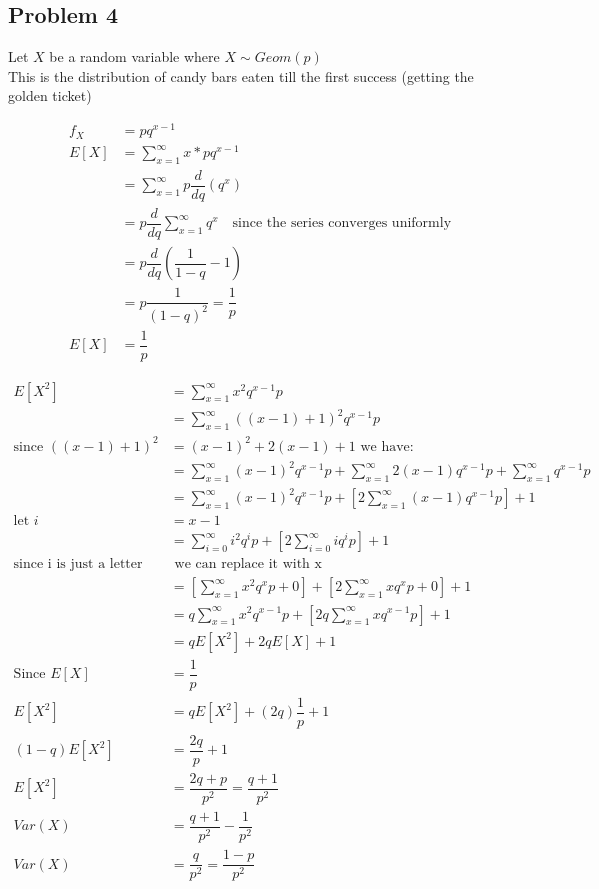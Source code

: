 \documentclass{article}
\begin{document}
\begin{flushleft}
\section*{Problem 4}
Let $X$ be a random variable where $X \sim Geom(p)$\\
This is the distribution of candy bars eaten till the first success (getting the golden ticket)

\begin{align*}
f_X&=pq^{x-1}\\
E[X]&=\sum_{x=1}^{\infty}x*pq^{x-1}\\
&=\sum_{x=1}^{\infty}p\dfrac{d}{dq}(q^x)\\
&=p\dfrac{d}{dq}\sum_{x=1}^{\infty}q^x \quad \text{since the series converges uniformly}\\
&=p\dfrac{d}{dq}(\dfrac{1}{1-q}-1)\\
&=p\dfrac{1}{(1-q)^2}=\dfrac{1}{p}\\
E[X]&=\dfrac{1}{p}
\end{align*}

\begin{align*}
E[X^2]&=\sum_{x=1}^{\infty}x^2q^{x-1}p\\
&=\sum_{x=1}^{\infty}((x-1)+1)^2q^{x-1}p\\
\text{since } ((x-1)+1)^2&=(x-1)^2+2(x-1)+1 \text{ we have:}\\
&=\sum_{x=1}^{\infty}(x-1)^2 q^{x-1}p+\sum_{x=1}^{\infty}2(x-1) q^{x-1}p+\sum_{x=1}^{\infty}q^{x-1}p\\
&=\sum_{x=1}^{\infty}(x-1)^2q^{x-1}p+[2\sum_{x=1}^{\infty}(x-1)q^{x-1}p]+1\\
\text{let } i&=x-1\\
&=\sum_{i=0}^{\infty}i^2q^{i}p+[2\sum_{i=0}^{\infty}iq^{i}p]+1\\
\text{since i is just a letter}&\text{ we can replace it with x}\\
&=[\sum_{x=1}^{\infty}x^2q^{x}p+0]+[2\sum_{x=1}^{\infty}xq^{x}p+0]+1\\
&=q\sum_{x=1}^{\infty}x^2q^{x-1}p+[2q\sum_{x=1}^{\infty}xq^{x-1}p]+1\\
&=qE[X^2]+2qE[X]+1\\
\text{Since } E[X]&=\dfrac{1}{p}\\
E[X^2]&=qE[X^2]+(2q)\dfrac{1}{p}+1\\
(1-q)E[X^2]&=\dfrac{2q}{p}+1\\
E[X^2]&=\dfrac{2q+p}{p^2}=\dfrac{q+1}{p^2}\\
Var(X)&=\dfrac{q+1}{p^2}-\dfrac{1}{p^2}\\
Var(X)&=\dfrac{q}{p^2}=\dfrac{1-p}{p^2}\\
\end{align*}
\pagebreak

\end{flushleft}
\end{document}
